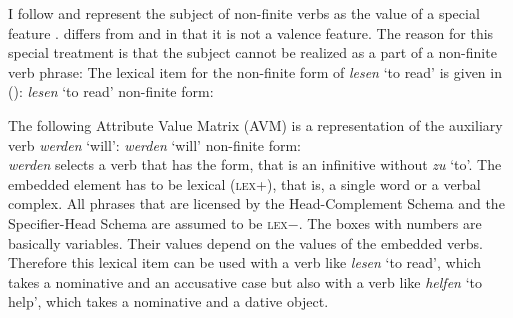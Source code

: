 I follow
\citet[Section~3.1.1]{Kiss95a} and represent the subject of non-finite verbs as the value of a
special feature \subj. \subj differs from \spr and \comps in that it is not a valence feature. The
reason for this special treatment is that the subject cannot be realized as a part of a non-finite
verb phrase:
\eal
{}
\zl
The lexical item for the non-finite form of \emph{lesen} `to read' is given in ():
\ea
\emph{lesen} `to read' non-finite form:\\
\z

The following Attribute Value Matrix (AVM) is a representation of the auxiliary verb \emph{werden} `will':
\eas
\emph{werden} `will' non-finite form:\\
\zs
\emph{werden} selects a verb that has the  form, that is an infinitive without \emph{zu}
`to'. The embedded element has to be lexical (\textsc{lex}+), that is, a single word or a verbal
complex. All phrases that are licensed by the Head-Complement Schema and the Specifier-Head Schema
are assumed to be \textsc{lex}$-$.
The boxes with numbers are basically variables. Their values depend on the values of the
embedded verbs. Therefore this lexical item can be used with a verb like \emph{lesen} `to read',
which takes a nominative and an accusative case but also with a verb like \emph{helfen} `to help',
which takes a nominative and a dative object.

